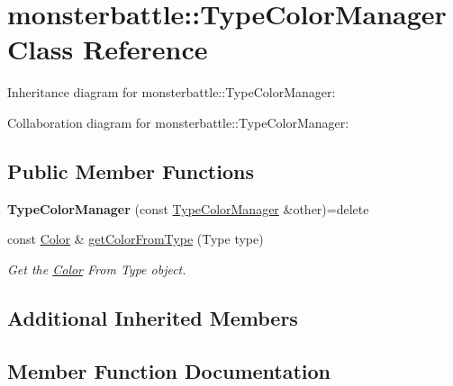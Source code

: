 \hypertarget{classmonsterbattle_1_1TypeColorManager}{}\section{monsterbattle\+:\+:Type\+Color\+Manager Class Reference}
\label{classmonsterbattle_1_1TypeColorManager}


Inheritance diagram for monsterbattle\+:\+:Type\+Color\+Manager\+:


Collaboration diagram for monsterbattle\+:\+:Type\+Color\+Manager\+:
\subsection*{Public Member Functions}
\begin{DoxyCompactItemize}
\item 
\mbox{\label{classmonsterbattle_1_1TypeColorManager_a5740d8c01448bea0a6ca91ef9e144b4e}} 
{\bfseries Type\+Color\+Manager} (const \hyperlink{classmonsterbattle_1_1TypeColorManager}{Type\+Color\+Manager} \&other)=delete
\item 
const \hyperlink{structmonsterbattle_1_1Color}{Color} \& \hyperlink{classmonsterbattle_1_1TypeColorManager_a02115a5b265315c9fce4fc9711ec2499}{get\+Color\+From\+Type} (Type type)
\begin{DoxyCompactList}\small\item\em Get the \hyperlink{structmonsterbattle_1_1Color}{Color} From Type object. \end{DoxyCompactList}\end{DoxyCompactItemize}
\subsection*{Additional Inherited Members}


\subsection{Member Function Documentation}
\mbox{\label{classmonsterbattle_1_1TypeColorManager_a02115a5b265315c9fce4fc9711ec2499}} 
